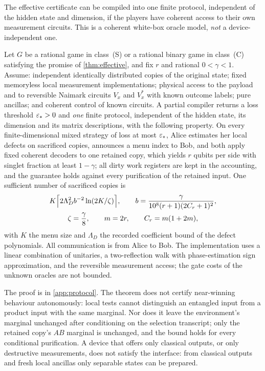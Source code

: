 The effective certificate can be compiled into one finite protocol, independent of the hidden state and dimension, if
the players have coherent access to their own measurement circuits. This is a coherent white-box oracle model, \emph{not}
a device-independent one.

\begin{theorem}\label{thm:protocol}
Let $G$ be a rational game in class~(S) or a rational binary game in class~(C) satisfying the promise of
\cref{thm:effective}, and fix $r$ and rational $0<\gamma<1$. Assume: independent identically distributed copies of the
original state; fixed memoryless local measurement implementations; physical access to the payload and to reversible
Naimark circuits $V_x$ and $V_x^*$ with known outcome labels; pure ancillas; and coherent control of known circuits. A
partial compiler returns a loss threshold $\varepsilon_*>0$ and \emph{one} finite protocol, independent of the hidden state, its
dimension and its matrix descriptions, with the following property. On every finite-dimensional mixed strategy of loss at
most $\varepsilon_*$, Alice estimates her local defects on sacrificed copies, announces a menu index to Bob, and both apply
fixed coherent decoders to one retained copy, which yields $r$ qubits per side with singlet fraction at least $1-\gamma$;
all dirty work registers are kept in the accounting, and the guarantee holds against every purification of the retained
input. One sufficient number of sacrificed copies is
\begin{gather*}
K\Bigl\lceil2\Lambda_D^2b^{-2}\ln(2K/\zeta)\Bigr\rceil,\qquad b=\frac{\gamma}{10^8(r+1)(2C_r+1)^2},\\
\zeta=\frac\gamma8,\qquad m=2r,\qquad C_r=m(1+2m),
\end{gather*}
with $K$ the menu size and $\Lambda_D$ the recorded coefficient bound of the defect polynomials. All communication is from
Alice to Bob. The implementation uses a linear combination of unitaries, a two-reflection walk with phase-estimation
sign approximation, and the reversible measurement access; the gate costs of the unknown oracles are not bounded.
\end{theorem}

The proof is in \cref{app:protocol}. The theorem does not certify near-winning behaviour autonomously: local tests
cannot distinguish an entangled input from a product input with the same marginal. Nor does it leave the environment's
marginal unchanged after conditioning on the selection transcript; only the retained copy's $AB$ marginal is unchanged,
and the bound holds for every conditional purification. A device that offers only classical outputs, or only destructive
measurements, does not satisfy the interface: from classical outputs and fresh local ancillas only separable states can be
prepared.

